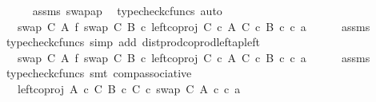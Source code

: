 \begin{isabellebody}
\ \ \ \ \isamarkupfalse%
\ assms\ swap{\isacharunderscore}{\kern0pt}ap\ \isamarkupfalse%
\ {\isacharparenleft}{\kern0pt}typecheck{\isacharunderscore}{\kern0pt}cfuncs{\isacharcomma}{\kern0pt}\ auto{\isacharparenright}{\kern0pt}\isanewline
\ \ \isamarkupfalse%
\ \isamarkupfalse%
\ {\isachardoublequoteopen}{\isachardot}{\kern0pt}{\isachardot}{\kern0pt}{\isachardot}{\kern0pt}\ {\isacharequal}{\kern0pt}\ {\isacharparenleft}{\kern0pt}swap\ C\ A\ {\isasymbowtie}\isactrlsub f\ swap\ C\ B{\isacharparenright}{\kern0pt}\ {\isasymcirc}\isactrlsub c\ left{\isacharunderscore}{\kern0pt}coproj\ {\isacharparenleft}{\kern0pt}C\ {\isasymtimes}\isactrlsub c\ A{\isacharparenright}{\kern0pt}\ {\isacharparenleft}{\kern0pt}C\ {\isasymtimes}\isactrlsub c\ B{\isacharparenright}{\kern0pt}\ {\isasymcirc}\isactrlsub c\ {\isasymlangle}c{\isacharcomma}{\kern0pt}\ a{\isasymrangle}{\isachardoublequoteclose}\isanewline
\ \ \ \ \isamarkupfalse%
\ assms\ \isamarkupfalse%
\ {\isacharparenleft}{\kern0pt}typecheck{\isacharunderscore}{\kern0pt}cfuncs{\isacharcomma}{\kern0pt}\ simp\ add{\isacharcolon}{\kern0pt}\ dist{\isacharunderscore}{\kern0pt}prod{\isacharunderscore}{\kern0pt}coprod{\isacharunderscore}{\kern0pt}left{\isacharunderscore}{\kern0pt}ap{\isacharunderscore}{\kern0pt}left{\isacharparenright}{\kern0pt}\isanewline
\ \ \isamarkupfalse%
\ \isamarkupfalse%
\ {\isachardoublequoteopen}{\isachardot}{\kern0pt}{\isachardot}{\kern0pt}{\isachardot}{\kern0pt}\ {\isacharequal}{\kern0pt}\ {\isacharparenleft}{\kern0pt}{\isacharparenleft}{\kern0pt}swap\ C\ A\ {\isasymbowtie}\isactrlsub f\ swap\ C\ B{\isacharparenright}{\kern0pt}\ {\isasymcirc}\isactrlsub c\ left{\isacharunderscore}{\kern0pt}coproj\ {\isacharparenleft}{\kern0pt}C\ {\isasymtimes}\isactrlsub c\ A{\isacharparenright}{\kern0pt}\ {\isacharparenleft}{\kern0pt}C\ {\isasymtimes}\isactrlsub c\ B{\isacharparenright}{\kern0pt}{\isacharparenright}{\kern0pt}\ {\isasymcirc}\isactrlsub c\ {\isasymlangle}c{\isacharcomma}{\kern0pt}\ a{\isasymrangle}{\isachardoublequoteclose}\isanewline
\ \ \ \ \isamarkupfalse%
\ assms\ \isamarkupfalse%
\ {\isacharparenleft}{\kern0pt}typecheck{\isacharunderscore}{\kern0pt}cfuncs{\isacharcomma}{\kern0pt}\ smt\ comp{\isacharunderscore}{\kern0pt}associative{}{\isacharparenright}{\kern0pt}\isanewline
\ \ \isamarkupfalse%
\ \isamarkupfalse%
\ {\isachardoublequoteopen}{\isachardot}{\kern0pt}{\isachardot}{\kern0pt}{\isachardot}{\kern0pt}\ {\isacharequal}{\kern0pt}\ {\isacharparenleft}{\kern0pt}left{\isacharunderscore}{\kern0pt}coproj\ {\isacharparenleft}{\kern0pt}A\ {\isasymtimes}\isactrlsub c\ C{\isacharparenright}{\kern0pt}\ {\isacharparenleft}{\kern0pt}B\ {\isasymtimes}\isactrlsub c\ C{\isacharparenright}{\kern0pt}\ {\isasymcirc}\isactrlsub c\ swap\ C\ A{\isacharparenright}{\kern0pt}\ {\isasymcirc}\isactrlsub c\ {\isasymlangle}c{\isacharcomma}{\kern0pt}\ a{\isasymrangle}{\isachardoublequoteclose}\isanewline

\end{isabellebody}
